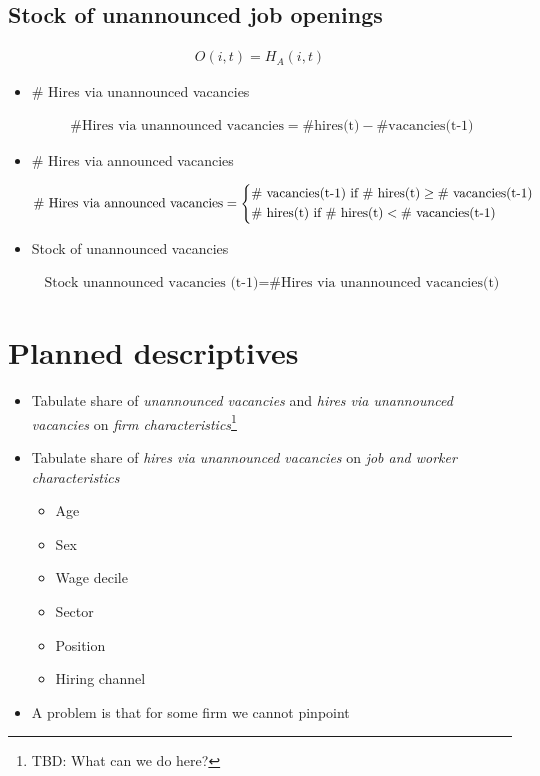 \documentclass{article}
\begin{document}
\subsection{Stock of unannounced job openings}
\begin{align}
O(i,t)=H_A(i,t)
\end{align}




\begin{itemize}
	\item \# Hires via unannounced vacancies
	
	\begin{align}
	\text{\# Hires via unannounced vacancies} =  \text{\# hires(t)} - \text{\# vacancies(t-1)}
	\end{align}
	
	\item \# Hires via announced vacancies
	
	\begin{align}
	\text{\# Hires via announced vacancies} = 
	\begin{dcases}
	\text{\# vacancies(t-1)}  \text{ if \# hires(t)} \geq \text{\# vacancies(t-1)} \\
	\text{\# hires(t)} \text{ if \# hires(t)} < \text{\# vacancies(t-1)}
	\end{dcases}
	\end{align}
	
	\item Stock of unannounced vacancies
	
	\begin{align}
	\text{Stock unannounced vacancies (t-1)} = \text{\# Hires via unannounced vacancies(t)}
	\end{align}
\end{itemize}

\section{Planned descriptives}

\begin{itemize}
	\item Tabulate share of \emph{unannounced vacancies} and \emph{hires via unannounced vacancies} on \emph{firm characteristics}\footnote{TBD: What can we do here?}
	\item Tabulate share of \emph{hires via unannounced vacancies} on \emph{job and worker characteristics}
	\begin{itemize}
		\item Age
		\item Sex
		\item Wage decile
		\item Sector
		\item Position
		\item Hiring channel
	\end{itemize}
	\item A problem is that for some firm we cannot pinpoint 
\end{itemize}
\end{document}
